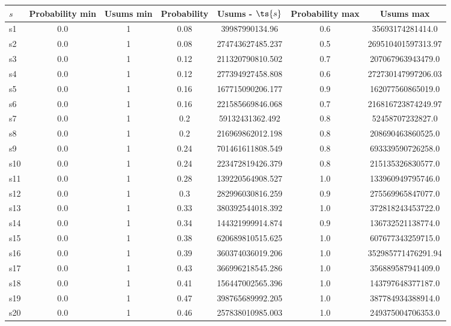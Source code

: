\documentclass{article}
\begin{document}
\noindent\begin{tabular}{|l|c|c|c|c|c|c|}
\hline
$s$& Probability min & Usums min & Probability & Usums - $\ts{s}$ & Probability max & Usums max\\
\hline
s1 &0.0 & 1 & 0.08 & 39987990134.96 & 0.6 & 35693174281414.0\\
\hline
s2 &0.0 & 1 & 0.08 & 274743627485.237 & 0.5 & 269510401597313.97\\
\hline
s3 &0.0 & 1 & 0.12 & 211320790810.502 & 0.7 & 207067963943479.0\\
\hline
s4 &0.0 & 1 & 0.12 & 277394927458.808 & 0.6 & 272730147997206.03\\
\hline
s5 &0.0 & 1 & 0.16 & 167715090206.177 & 0.9 & 162077560865019.0\\
\hline
s6 &0.0 & 1 & 0.16 & 221585669846.068 & 0.7 & 216816723874249.97\\
\hline
s7 &0.0 & 1 & 0.2 & 59132431362.492 & 0.8 & 52458707232827.0\\
\hline
s8 &0.0 & 1 & 0.2 & 216969862012.198 & 0.8 & 208690463860525.0\\
\hline
s9 &0.0 & 1 & 0.24 & 701461611808.549 & 0.8 & 693339590726258.0\\
\hline
s10 &0.0 & 1 & 0.24 & 223472819426.379 & 0.8 & 215135326830577.0\\
\hline
s11 &0.0 & 1 & 0.28 & 139220564908.527 & 1.0 & 133960949795746.0\\
\hline
s12 &0.0 & 1 & 0.3 & 282996030816.259 & 0.9 & 275569965847077.0\\
\hline
s13 &0.0 & 1 & 0.33 & 380392544018.392 & 1.0 & 372818243453722.0\\
\hline
s14 &0.0 & 1 & 0.34 & 144321999914.874 & 0.9 & 136732521138774.0\\
\hline
s15 &0.0 & 1 & 0.38 & 620689810515.625 & 1.0 & 607677343259715.0\\
\hline
s16 &0.0 & 1 & 0.39 & 360374036019.206 & 1.0 & 352985771476291.94\\
\hline
s17 &0.0 & 1 & 0.43 & 366996218545.286 & 1.0 & 356889587941409.0\\
\hline
s18 &0.0 & 1 & 0.41 & 156447002565.396 & 1.0 & 143797648377187.0\\
\hline
s19 &0.0 & 1 & 0.47 & 398765689992.205 & 1.0 & 387784934388914.0\\
\hline
s20 &0.0 & 1 & 0.46 & 257838010985.003 & 1.0 & 249375004706353.0\\
\hline
\end{tabular}\\
\end{document}
